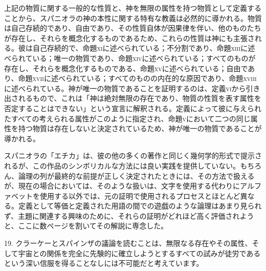 \documentclass[a4paper,11pt,openany]{ltjsbook}
\begin{document}
上記の物質に関する一般的な性質と、神を無限の属性を持つ物質として定義することから、スパニオラの神の本性に関する特有な教義は必然的に導かれる。物質は自己存続的であり、自由であり、その性質自体が因果律を伴い、他のものたちが存在し、それらを概念化するものであるため、これらの性質は神にも主張される。彼は自己存続的で、命題\textsc{xi}に述べられている；不分割であり、命題\textsc{xiii}に述べられている；唯一の物質であり、命題\textsc{xiv}に述べられている；すべてのものが存在し、それらを概念化するものである、命題\textsc{xv}に述べられている；自由であり、命題\textsc{xvii}に述べられている；すべてのものの内在的な原因であり、命題\textsc{xviii}に述べられている。神が唯一の物質であることを証明するのは、定義\textsc{vi}から引き出されるもので、これは「神は絶対無限の存在であり、物質の性質を表す属性を否定することはできない」という宣言に解釈される。定義によって彼に与えられたすべての考えられる属性がこのように指定され、命題\textsc{v}において二つの同じ属性を持つ物質は存在しないと決定されているため、神が唯一の物質であることが導かれる。

スパニオラの「エチカ」は、彼の他の多くの著作と同じく幾何学的形式で提示されるが、この作品のシンボリカルな方法には良い実践を提供していない。もちろん、論理の列が最終的な前提が正しく決定されたときには、その方法で扱えるが、現在の場合においては、そのような扱いは、文字を使用する代わりにアルファベットを使用する以外では、元の証明で使用されるプロセスとほとんど異なる。定義として等価と定義された用語の間での遊戯のような論理はあまり見られず、主題に関連する興味のために、それらの証明がどれほど高く評価されようと、ここに数ページを割いてその解説に専念した。

19. クラーケーとスパインザの議論を読むことは、無限なる存在やその属性、そして宇宙との関係を完全に先験的に確立しようとするすべての試みが徒労であるという深い信服を得ることなしには不可能だと考えています。
\end{document}

